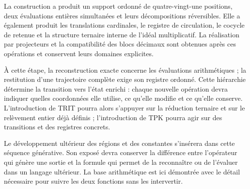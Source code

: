 La construction a produit un support ordonné de quatre-vingt-une positions, deux évaluations entières simultanées et leurs décompositions réversibles. Elle a également produit les translations cardinales, le registre de circulation, le cocycle de retenue et la structure ternaire interne de l'idéal multiplicatif. La réalisation par projecteurs et la compatibilité des blocs décimaux sont obtenues après ces opérations et conservent leurs domaines explicites.

À cette étape, la reconstruction exacte concerne les évaluations arithmétiques ; la restitution d'une trajectoire complète exige son registre ordonné. Cette hiérarchie détermine la transition vers l'état enrichi : chaque nouvelle opération devra indiquer quelles coordonnées elle utilise, ce qu'elle modifie et ce qu'elle conserve. L'introduction de TRIT pourra alors s'appuyer sur la réduction ternaire et sur le relèvement entier déjà définis ; l'introduction de TPK pourra agir sur des transitions et des registres concrets.

Le développement ultérieur des régions et des constantes s'insérera dans cette séquence générative. Son exposé devra conserver la différence entre l'opérateur qui génère une sortie et la formule qui permet de la reconnaître ou de l'évaluer dans un langage ultérieur. La base arithmétique est ici démontrée avec le détail nécessaire pour suivre les deux fonctions sans les intervertir.
